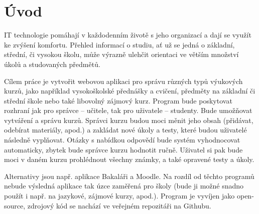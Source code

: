 \chapter{Úvod}

IT technologie pomáhají v každodenním životě s jeho organizací a dají se využít ke zvýšení
komfortu. Přehled informací o studiu, ať už se jedná o základní, střední, či vysokou školu, může výrazně ulehčit orientaci ve větším množství úkolů a studovaných předmětů.

Cílem práce je vytvořit webovou aplikaci pro správu různých typů výukových kurzů, jako například vysokoškolské přednášky a cvičení, předměty na základní či střední škole nebo také libovolný zájmový kurz. Program bude poskytovat rozhraní jak pro správce – učitele, tak pro uživatele – studenty. Bude umožňovat vytváření a správu kurzů. Správci kurzu budou moci měnit jeho obsah (přidávat, odebírat materiály, apod.) a zakládat nové úkoly a testy, které budou uživatelé následně vyplňovat. Otázky s nabídkou odpovědí bude systém vyhodnocovat automaticky, zbytek bude správce kurzu hodnotit ručně. Uživatel si pak bude moci v daném kurzu prohlédnout všechny známky, a také opravené testy a úkoly.

Alternativy jsou např. aplikace Bakaláři a Moodle. Na rozdíl od těchto programů nebude výsledná aplikace tak úzce zaměřená pro školy (bude ji možné snadno použít i např. na jazykové, zájmové kurzy, apod.).
Program je vyvíjen jako open-source, zdrojový kód se nachází ve veřejném repozitáři na Githubu.

